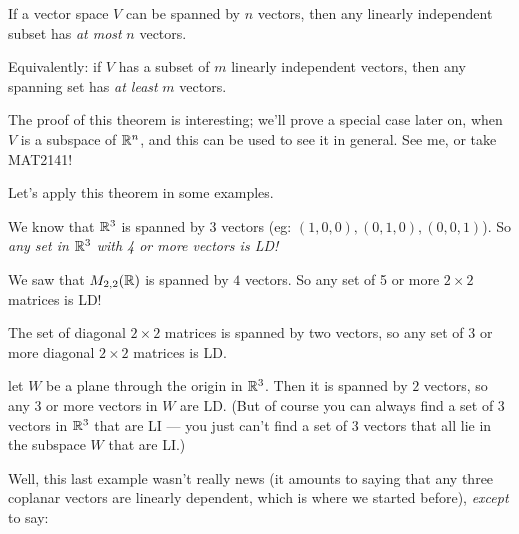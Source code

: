 \begin{theorem} 
If a vector space $V$ can be spanned by $n$ vectors, then
any linearly independent subset has \emph{at most} $n$ vectors.

Equivalently:  if $V$ has a subset of $m$ linearly independent
vectors, then any spanning set has \emph{at least} $m$ vectors.
\end{theorem}



The proof of this theorem is interesting; we'll prove a special case later on, when $V$ is a subspace of $\mathbb{R}^n$,  and this can be used  to see it in general. See me, or
take  MAT2141!   

Let's apply this theorem in some examples.

\begin{myexample} We know that $\mathbb{R}^3$ is spanned by $3$ vectors
(eg:  $(1,0,0), (0,1,0), (0,0,1)$).  So \emph{any set
in $\mathbb{R}^3$ with 4 or more vectors is LD!} \end{myexample}

\begin{myexample} We saw that $M_{2,2}(\mathbb{R})$ is spanned by $4$
vectors.  So any set of 5 or more $2 \times 2$ matrices is LD!  \end{myexample}

\begin{myexample} The set of diagonal $2\times 2$ matrices is spanned
by two vectors, so any set of $3$ or more diagonal $2\times 2$
matrices is LD. \end{myexample}

\begin{myexample} let $W$ be a plane through the origin in $\mathbb{R}^3$.
Then it is spanned by $2$ vectors, so
any 3 or more vectors in $W$ are LD.   (But of course you
can always find a set of $3$ vectors in $\mathbb{R}^3$ that are LI --- 
you just can't find a set of $3$ vectors that all lie in 
the subspace $W$ that are LI.) \end{myexample}

Well, this last example wasn't really news (it amounts to
saying that any three coplanar vectors are linearly dependent,
which is where we started before), \emph{except}  to say:


